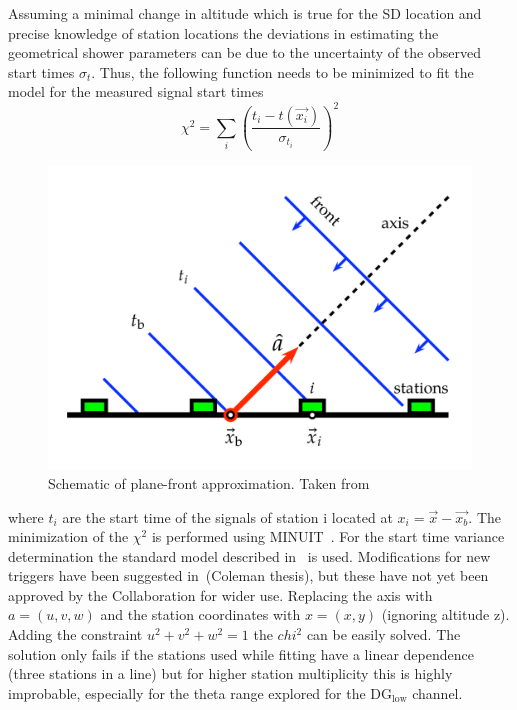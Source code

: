 Assuming a minimal change in altitude which is true for the SD location and precise knowledge of station locations the deviations in estimating the geometrical shower parameters can be due to the uncertainty of the observed start times $\sigma_t$. Thus, the following function needs to be minimized to fit the model for the measured signal start times 
\begin{equation}
  \chi^2 = \sum_{i} \left(\frac{t_i - t(\vec{x_i})}{\sigma_{t_{i}}}\right)^2
\end{equation}


\begin{figure}[h!]
  \centering
  \includegraphics[width=\textwidth]{thesis_figures/Nu_analysis/Plane_fit.pdf}
  \caption{Schematic of plane-front approximation. Taken from~\cite{PierreAuger:2020yab}}
  \label{fig:Plane_fit}
  \end{figure}

where $t_i$ are the start time of the signals of station i located at $x_i = \vec{x} - \vec{x_b}$. The minimization of the $\chi^2$ is performed using MINUIT~\cite{James:1975dr}. For the start time variance determination the standard model described in~\cite{PierreAuger:2020yab} is used. Modifications for new triggers have been suggested in~\cite{}(Coleman thesis), but these have not yet been approved by the Collaboration for wider use. Replacing the axis with $a =(u,v,w)$ and the station coordinates with $x = (x,y)$ (ignoring altitude z). Adding the constraint $u^2 + v^2 + w^2 = 1$ the $chi^2$ can be easily solved. The solution only fails if the stations used while fitting have a linear dependence (three stations in a line) but for higher station multiplicity this is highly improbable, especially for the theta range explored for the DG$\mathrm{_{low}}$ channel.

